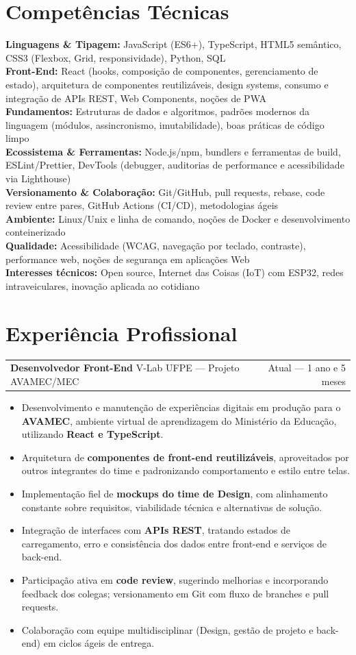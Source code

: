 \documentclass[a4paper,10.5pt]{article}
\makeatletter
\newcommand{\cargo}[3]{%
  \vspace{2pt}
  \begin{tabularx}{\textwidth}{@{}Xr@{}}
    \textbf{#1} \textnormal{\textbar{} #2} & \textcolor{muted}{#3}
  \end{tabularx}%
  \vspace{1pt}
}
\newcommand{\skillline}[2]{\textbf{#1:} #2\\}
\makeatother
\begin{document}
\section{Competências Técnicas}
\skillline{Linguagens \& Tipagem}{JavaScript (ES6+), TypeScript, HTML5 semântico, CSS3 (Flexbox, Grid, responsividade), Python, SQL}
\skillline{Front-End}{React (hooks, composição de componentes, gerenciamento de estado), arquitetura de componentes reutilizáveis, design systems, consumo e integração de APIs REST, Web Components, noções de PWA}
\skillline{Fundamentos}{Estruturas de dados e algoritmos, padrões modernos da linguagem (módulos, assincronismo, imutabilidade), boas práticas de código limpo}
\skillline{Ecossistema \& Ferramentas}{Node.js/npm, bundlers e ferramentas de build, ESLint/Prettier, DevTools (debugger, auditorias de performance e acessibilidade via Lighthouse)}
\skillline{Versionamento \& Colaboração}{Git/GitHub, pull requests, rebase, code review entre pares, GitHub Actions (CI/CD), metodologias ágeis}
\skillline{Ambiente}{Linux/Unix e linha de comando, noções de Docker e desenvolvimento conteinerizado}
\skillline{Qualidade}{Acessibilidade (WCAG, navegação por teclado, contraste), performance web, noções de segurança em aplicações Web}
\skillline{Interesses técnicos}{Open source, Internet das Coisas (IoT) com ESP32, redes intraveiculares, inovação aplicada ao cotidiano}

\section{Experiência Profissional}

\cargo{Desenvolvedor Front-End}{V-Lab UFPE --- Projeto AVAMEC/MEC}{Atual --- 1 ano e 5 meses}
\begin{itemize}
  \item Desenvolvimento e manutenção de experiências digitais em produção para o \textbf{AVAMEC}, ambiente virtual de aprendizagem do Ministério da Educação, utilizando \textbf{React e TypeScript}.
  \item Arquitetura de \textbf{componentes de front-end reutilizáveis}, aproveitados por outros integrantes do time e padronizando comportamento e estilo entre telas.
  \item Implementação fiel de \textbf{mockups do time de Design}, com alinhamento constante sobre requisitos, viabilidade técnica e alternativas de solução.
  \item Integração de interfaces com \textbf{APIs REST}, tratando estados de carregamento, erro e consistência dos dados entre front-end e serviços de back-end.
  \item Participação ativa em \textbf{code review}, sugerindo melhorias e incorporando feedback dos colegas; versionamento em Git com fluxo de branches e pull requests.
  \item Colaboração com equipe multidisciplinar (Design, gestão de projeto e back-end) em ciclos ágeis de entrega.
\end{itemize}
\end{document}
